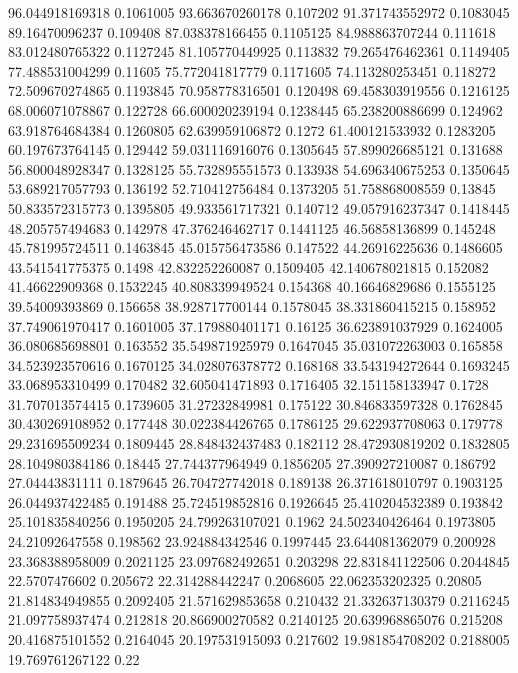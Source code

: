 96.044918169318 0.1061005
93.663670260178 0.107202
91.371743552972 0.1083045
89.16470096237 0.109408
87.038378166455 0.1105125
84.988863707244 0.111618
83.012480765322 0.1127245
81.105770449925 0.113832
79.265476462361 0.1149405
77.488531004299 0.11605
75.772041817779 0.1171605
74.113280253451 0.118272
72.509670274865 0.1193845
70.958778316501 0.120498
69.458303919556 0.1216125
68.006071078867 0.122728
66.600020239194 0.1238445
65.238200886699 0.124962
63.918764684384 0.1260805
62.639959106872 0.1272
61.400121533932 0.1283205
60.197673764145 0.129442
59.031116916076 0.1305645
57.899026685121 0.131688
56.800048928347 0.1328125
55.732895551573 0.133938
54.696340675253 0.1350645
53.689217057793 0.136192
52.710412756484 0.1373205
51.758868008559 0.13845
50.833572315773 0.1395805
49.933561717321 0.140712
49.057916237347 0.1418445
48.205757494683 0.142978
47.376246462717 0.1441125
46.56858136899 0.145248
45.781995724511 0.1463845
45.015756473586 0.147522
44.26916225636 0.1486605
43.541541775375 0.1498
42.832252260087 0.1509405
42.140678021815 0.152082
41.46622909368 0.1532245
40.808339949524 0.154368
40.16646829686 0.1555125
39.54009393869 0.156658
38.928717700144 0.1578045
38.331860415215 0.158952
37.749061970417 0.1601005
37.179880401171 0.16125
36.623891037929 0.1624005
36.080685698801 0.163552
35.549871925979 0.1647045
35.031072263003 0.165858
34.523923570616 0.1670125
34.028076378772 0.168168
33.543194272644 0.1693245
33.068953310499 0.170482
32.605041471893 0.1716405
32.151158133947 0.1728
31.707013574415 0.1739605
31.27232849981 0.175122
30.846833597328 0.1762845
30.430269108952 0.177448
30.022384426765 0.1786125
29.622937708063 0.179778
29.231695509234 0.1809445
28.848432437483 0.182112
28.472930819202 0.1832805
28.104980384186 0.18445
27.744377964949 0.1856205
27.390927210087 0.186792
27.04443831111 0.1879645
26.704727742018 0.189138
26.371618010797 0.1903125
26.044937422485 0.191488
25.724519852816 0.1926645
25.410204532389 0.193842
25.101835840256 0.1950205
24.799263107021 0.1962
24.502340426464 0.1973805
24.21092647558 0.198562
23.924884342546 0.1997445
23.644081362079 0.200928
23.368388958009 0.2021125
23.097682492651 0.203298
22.831841122506 0.2044845
22.5707476602 0.205672
22.314288442247 0.2068605
22.062353202325 0.20805
21.814834949855 0.2092405
21.571629853658 0.210432
21.332637130379 0.2116245
21.097758937474 0.212818
20.866900270582 0.2140125
20.639968865076 0.215208
20.416875101552 0.2164045
20.197531915093 0.217602
19.981854708202 0.2188005
19.769761267122 0.22
